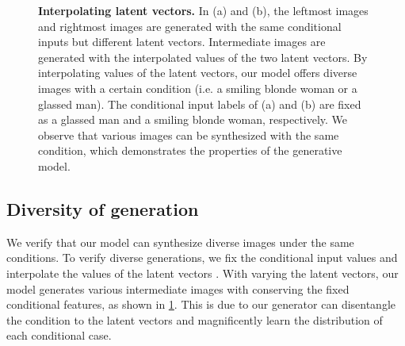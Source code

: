 \documentclass[nohyperref]{article}
\theoremstyle{plain}
\theoremstyle{definition}
\theoremstyle{remark}
\begin{document}
\begin{figure}[h!]
\begin{center}
\vskip -0.15in
\caption{\textbf{Interpolating latent vectors.} In (a) and (b), the leftmost images and rightmost images are generated with the same conditional inputs but different latent vectors. Intermediate images are generated with the interpolated values of the two latent vectors. By interpolating values of the latent vectors, our model offers diverse images with a certain condition (i.e. a smiling blonde woman or a glassed man). The conditional input labels of (a) and (b) are fixed as a glassed man and a smiling blonde woman, respectively. We observe that various images can be synthesized with the same condition, which demonstrates the properties of the generative model.}
\label{figure_7}
\end{center}
\vskip -0.2in
\end{figure}



\subsection{Diversity of generation}
We verify that our model can synthesize diverse images under the same conditions. To verify diverse generations, we fix the conditional input values and interpolate the values of the latent vectors \cite{shmelkov2018good}. With varying the latent vectors, our model generates various intermediate images with conserving the fixed conditional features, as shown in \cref{figure_7}. This is due to our generator can disentangle the condition to the latent vectors and magnificently learn the distribution of each conditional case. 
\end{document}

